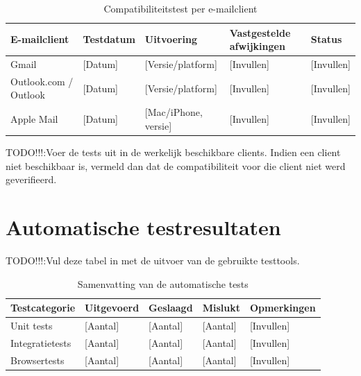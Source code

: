 \begin{table}[htbp]
    \centering
    \caption{Compatibiliteitstest per e-mailclient}
    \label{tab:compatibiliteit}
    \small
    \begin{tabular}{|p{3cm}|p{2.5cm}|p{2.5cm}|p{3.5cm}|p{2cm}|}
        \hline
        \textbf{E-mailclient} & \textbf{Testdatum} &
        \textbf{Uitvoering} & \textbf{Vastgestelde afwijkingen} &
        \textbf{Status} \\
        \hline
        Gmail & [Datum] & [Versie/platform] & [Invullen] & [Invullen] \\
        \hline
        Outlook.com / Outlook & [Datum] & [Versie/platform] &
        [Invullen] & [Invullen] \\
        \hline
        Apple Mail & [Datum] & [Mac/iPhone, versie] &
        [Invullen] & [Invullen] \\
        \hline
    \end{tabular}
\end{table}

TODO!!!:Voer de tests uit in de werkelijk beschikbare clients. Indien een client niet
beschikbaar is, vermeld dan dat de compatibiliteit voor die client niet werd
geverifieerd.

\section{Automatische testresultaten}

TODO!!!:Vul deze tabel in met de uitvoer van de gebruikte testtools.

\begin{table}[htbp]
    \centering
    \caption{Samenvatting van de automatische tests}
    \label{tab:automatische-tests}
    \begin{tabular}{|p{4cm}|p{2cm}|p{2cm}|p{2cm}|p{2.5cm}|}
        \hline
        \textbf{Testcategorie} & \textbf{Uitgevoerd} &
        \textbf{Geslaagd} & \textbf{Mislukt} & \textbf{Opmerkingen} \\
        \hline
        Unit tests & [Aantal] & [Aantal] & [Aantal] & [Invullen] \\
        \hline
        Integratietests & [Aantal] & [Aantal] & [Aantal] & [Invullen] \\
        \hline
        Browsertests & [Aantal] & [Aantal] & [Aantal] & [Invullen] \\
        \hline
    \end{tabular}
\end{table}


